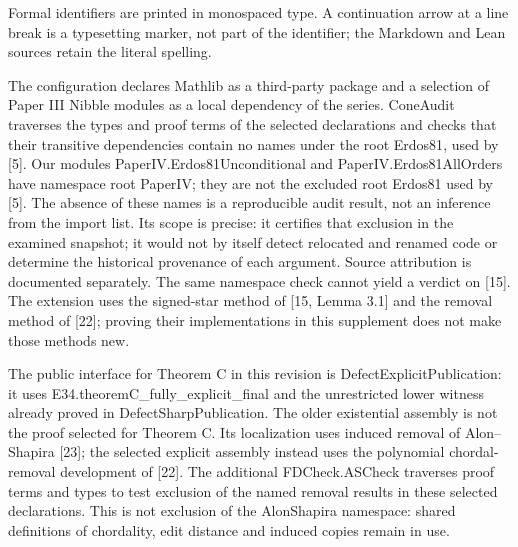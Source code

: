 \documentclass[english,11pt,a4paper]{article}
\begin{document}
Formal identifiers are printed in monospaced type. A continuation arrow at a line break is a typesetting marker, not part of the identifier; the Markdown and Lean sources retain the literal spelling.

The configuration declares Mathlib as a third-party package and a selection of Paper III {\ttfamily\small Nibble} modules as a local dependency of the series. {\ttfamily\small ConeAudit} traverses the types and proof terms of the selected declarations and checks that their transitive dependencies contain no names under the root {\ttfamily\small Erdos81}, used by {[}5{]}. Our modules {\ttfamily\small PaperIV.\discretionary{\hbox{\ensuremath{\hookrightarrow}}}{}{}Erdos81Uncon\discretionary{\hbox{\ensuremath{\hookrightarrow}}}{}{}ditional} and {\ttfamily\small PaperIV.\discretionary{\hbox{\ensuremath{\hookrightarrow}}}{}{}Erdos81AllOr\discretionary{\hbox{\ensuremath{\hookrightarrow}}}{}{}ders} have namespace root {\ttfamily\small PaperIV}; they are not the excluded root Erdos81 used by {[}5{]}. The absence of these names is a reproducible audit result, not an inference from the import list. Its scope is precise: it certifies that exclusion in the examined snapshot; it would not by itself detect relocated and renamed code or determine the historical provenance of each argument. Source attribution is documented separately. The same namespace check cannot yield a verdict on {[}15{]}. The extension uses the signed-star method of {[}15, Lemma 3.1{]} and the removal method of {[}22{]}; proving their implementations in this supplement does not make those methods new.

The public interface for Theorem C in this revision is {\ttfamily\small DefectExplic\discretionary{\hbox{\ensuremath{\hookrightarrow}}}{}{}itPublicatio\discretionary{\hbox{\ensuremath{\hookrightarrow}}}{}{}n}: it uses {\ttfamily\small E34.\discretionary{\hbox{\ensuremath{\hookrightarrow}}}{}{}theoremC\_\discretionary{\hbox{\ensuremath{\hookrightarrow}}}{}{}fully\_\discretionary{\hbox{\ensuremath{\hookrightarrow}}}{}{}explicit\_\discretionary{\hbox{\ensuremath{\hookrightarrow}}}{}{}final} and the unrestricted lower witness already proved in {\ttfamily\small DefectSharpP\discretionary{\hbox{\ensuremath{\hookrightarrow}}}{}{}ublication}. The older existential assembly is not the proof selected for Theorem C. Its localization uses induced removal of Alon--Shapira {[}23{]}; the selected explicit assembly instead uses the polynomial chordal-removal development of {[}22{]}. The additional {\ttfamily\small FDCheck.\discretionary{\hbox{\ensuremath{\hookrightarrow}}}{}{}ASCheck} traverses proof terms and types to test exclusion of the named removal results in these selected declarations. This is not exclusion of the {\ttfamily\small AlonShapira} namespace: shared definitions of chordality, edit distance and induced copies remain in use.
\end{document}
